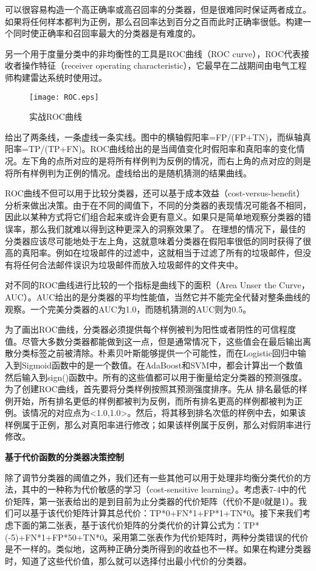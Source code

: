 可以很容易构造一个高正确率或高召回率的分类器，但是很难同时保证两者成立。如果将任何样本都判为正例，那么召回率达到百分之百而此时正确率很低。构建一个同时使正确率和召回率最大的分类器是有难度的。

另一个用于度量分类中的非均衡性的工具是ROC曲线（ROC curve），ROC代表接收者操作特征（receiver operating characteristic），它最早在二战期间由电气工程师构建雷达系统时使用过。

\begin{figure}[!h]
  \centering
  \texttt{[image: ROC.eps]}
  \caption{实战ROC曲线}
\end{figure}

给出了两条线，一条虚线一条实线。图中的横轴假阳率=FP/(FP+TN)，而纵轴真阳率=TP/(TP+FN)。ROC曲线给出的是当阈值变化时假阳率和真阳率的变化情况。左下角的点所对应的是将所有样例判为反例的情况，而右上角的点对应的则是将所有样例判为正例的情况。虚线给出的是随机猜测的结果曲线。

ROC曲线不但可以用于比较分类器，还可以基于成本效益（cost-versus-benefit）分析来做出决策。由于在不同的阈值下，不同的分类器的表现情况可能各不相同，因此以某种方式将它们组合起来或许会更有意义。如果只是简单地观察分类器的错误率，那么我们就难以得到这种更深入的洞察效果了。
在理想的情况下，最佳的分类器应该尽可能地处于左上角，这就意味着分类器在假阳率很低的同时获得了很高的真阳率。例如在垃圾邮件的过滤中，这就相当于过滤了所有的垃圾邮件，但没有将任何合法邮件误识为垃圾邮件而放入垃圾邮件的文件夹中。

对不同的ROC曲线进行比较的一个指标是曲线下的面积（Area Unser the Curve，AUC）。AUC给出的是分类器的平均性能值，当然它并不能完全代替对整条曲线的观察。一个完美分类器的AUC为1.0，而随机猜测的AUC则为0.5。

为了画出ROC曲线，分类器必须提供每个样例被判为阳性或者阴性的可信程度值。尽管大多数分类器都能做到这一点，但是通常情况下，这些值会在最后输出离散分类标签之前被清除。朴素贝叶斯能够提供一个可能性，而在Logistic回归中输入到Sigmoid函数中的是一个数值。在AdaBoost和SVM中，都会计算出一个数值然后输入到sign()函数中。所有的这些值都可以用于衡量给定分类器的预测强度。为了创建ROC曲线，首先要将分类样例按照其预测强度排序。先从
排名最低的样例开始，所有排名更低的样例都被判为反例，而所有排名更高的样例都被判为正例。该情况的对应点为<1.0,1.0>。然后，将其移到排名次低的样例中去，如果该样例属于正例，那么对真阳率进行修改；如果该样例属于反例，那么对假阴率进行修改。

\textbf{基于代价函数的分类器决策控制}

除了调节分类器的阈值之外，我们还有一些其他可以用于处理非均衡分类代价的方法，其中的一种称为代价敏感的学习（cost-sensitive learning）。考虑表7-4中的代价矩阵，第一张表给出的是到目前为止分类器的代价矩阵（代价不是0就是1）。我们可以基于该代价矩阵计算其总代价：TP*0+FN*1+FP*1+TN*0。接下来我们考虑下面的第二张表，基于该代价矩阵的分类代价的计算公式为：TP*(-5)+FN*1+FP*50+TN*0。采用第二张表作为代价矩阵时，两种分类错误的代价是不一样的。类似地，这两种正确分类所得到的收益也不一样。如果在构建分类器时，知道了这些代价值，那么就可以选择付出最小代价的分类器。

